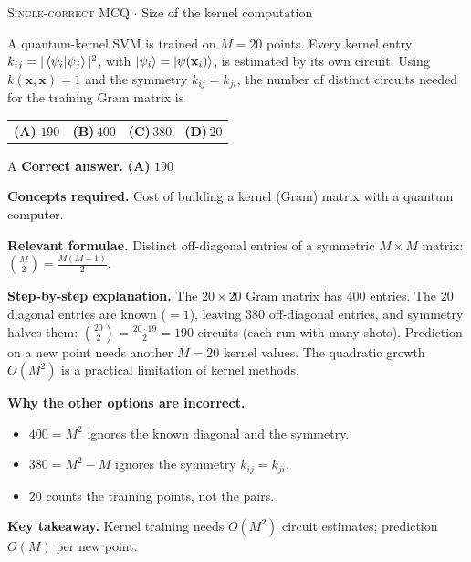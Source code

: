 \documentclass[11pt,a4paper]{article}
\newcommand{\optlabel}[1]{\textbf{(#1)}}
\newcommand{\correctlabel}[1]{\textcolor{okgreen}{\textbf{(#1)}\,\ding{51}}}
\newenvironment{qitem}[1]{\begin{list}{}{\setlength{\leftmargin}{3.3em}\setlength{\labelwidth}{3.1em}%
  \setlength{\labelsep}{0.2em}\setlength{\topsep}{3pt}\setlength{\parsep}{3pt}}\item[\textbf{Q.#1}\hfill]}{\end{list}}
\newcommand{\qsep}{\par\vspace{2pt}{\color{black!15}\hrule}\vspace{4pt}}
\newcommand{\qmeta}[2]{{\footnotesize\color{black!60}\textsc{#1} \;$\cdot$\; #2}\par}
\begin{document}
\begin{qitem}{45}
\qmeta{Single-correct MCQ}{Size of the kernel computation}
A quantum-kernel SVM is trained on $M = 20$ points. Every kernel entry $k_{ij} = |\braket{\psi_i|\psi_j}|^2$, with $\ket{\psi_i} = \ket{\psi(\mathbf x_i)}$,
is estimated by its own circuit. Using $k(\mathbf x, \mathbf x) = 1$ and the symmetry $k_{ij} = k_{ji}$, the number of distinct
circuits needed for the training Gram matrix is
\par\smallskip\noindent\begin{tabularx}{\linewidth}{@{}*{4}{L}@{}}
\correctlabel{A}\,$190$ & \optlabel{B}\,$400$ & \optlabel{C}\,$380$ & \optlabel{D}\,$20$
\end{tabularx}
\end{qitem}
\begin{solbox}{A}
\textbf{\color{brand}Correct answer.} \textcolor{okgreen}{\textbf{(A)}} $190$

\textbf{\color{brand}Concepts required.} Cost of building a kernel (Gram) matrix with a quantum computer.

\textbf{\color{brand}Relevant formulae.} Distinct off-diagonal entries of a symmetric $M\times M$ matrix: $\binom M2 = \frac{M(M-1)}{2}$.

\textbf{\color{brand}Step-by-step explanation.} The $20\times20$ Gram matrix has $400$ entries. The $20$ diagonal entries are known ($=1$), leaving $380$
off-diagonal entries, and symmetry halves them: $\binom{20}{2} = \frac{20\cdot19}{2} = 190$ circuits (each run with many shots).
Prediction on a new point needs another $M = 20$ kernel values. The quadratic growth $O(M^2)$ is a practical limitation of kernel methods.

\textbf{\color{brand}Why the other options are incorrect.}
\begin{itemize}[leftmargin=2.4em, itemsep=1pt, topsep=2pt]
\item[\textbf{(B)}] $400 = M^2$ ignores the known diagonal and the symmetry.
\item[\textbf{(C)}] $380 = M^2 - M$ ignores the symmetry $k_{ij} = k_{ji}$.
\item[\textbf{(D)}] $20$ counts the training points, not the pairs.
\end{itemize}
\textbf{\color{brand}Key takeaway.} Kernel training needs $O(M^2)$ circuit estimates; prediction $O(M)$ per new point.
\end{solbox}
\qsep
\end{document}
